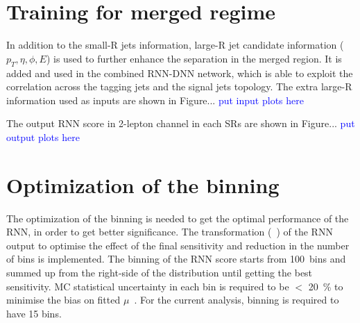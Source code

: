 \section{Training for merged regime}
In addition to the small-R jets information, large-R jet candidate information ($p_T, \eta, \phi, E$) is used to further enhance the separation in the merged region. It is added and used in the combined RNN-DNN network, which is able to exploit the correlation across the tagging jets and the signal jets topology.
The extra large-R information used as inputs are shown in Figure... \textcolor{blue}{put input plots here}

The output RNN score in 2-lepton channel in each SRs are shown in Figure... \textcolor{blue}{put output plots here}

\section{Optimization of the binning}
The optimization of the binning is needed to get the optimal performance of the RNN, in order to get better significance. The transformation (~\cite{ATL-PHYS-PUB-2019-009}) of the RNN output to optimise the effect of the final sensitivity and reduction in the number of bins is implemented.
The binning of the RNN score starts from 100~bins and summed up from the right-side of the distribution until getting the best sensitivity. 
MC statistical uncertainty in each bin is required to be $<$ 20~\% to minimise the bias on fitted $\mu$~\cite{ATL-PHYS-PUB-2019-009}. For the current analysis, binning is required to have 15 bins.